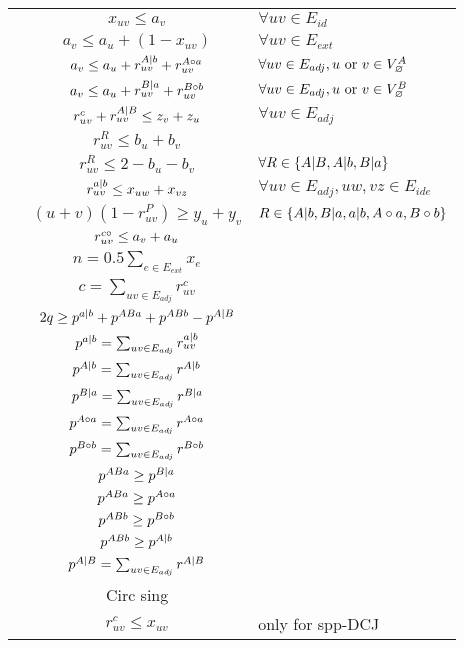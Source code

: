 \documentclass{article}[7pt]
\begin{document}
\begin{algorithm}[htb]
\begin{constraints}
\begin{tabular}{lcl}
    \cns & $x_{uv} \leq a_v$&$\forall uv\in E_{id}$\\
    \cns & $a_v \leq a_u + (1-x_{uv})$&$\forall uv\in E_{ext}$\\
    \cns & $a_v \leq a_u + r_{uv}^{A| b} + r_{uv}^{A\circ a}$&$\forall uv\in E_{adj}, u \text{ or } v\in V_{\varnothing}^A$\\
    & $a_v \leq a_u + r_{uv}^{B| a} + r_{uv}^{B\circ b}$&$\forall uv\in E_{adj}, u \text{ or } v\in V_{\varnothing}^B$\\
    \cns & $r_{uv}^c + r_{uv}^{A| B} \leq z_v + z_u$&$\forall uv \in E_{adj}$\\
    \cns & $r_{uv}^{R} \leq b_u + b_v$\\
    \cns & $r_{uv}^{R} \leq 2-b_u - b_v$&$\forall R \in \{A| B, A| b, B| a\}$\\
    \cns & $r_{uv}^{a| b} \leq x_{uw} + x_{vz}$&$\forall uv\in E_{adj}, uw,vz \in E_{ide}$\\
    \cns & $(u+v)(1-r_{uv}^{P}) \geq y_u +y_v$&$R\in  \{A| b , B| a , a| b, A\circ a , B\circ b\}$\\
    \cns & $ r_{uv}^{c\circ}\leq a_v + a_u $\\

    \cns & $n = 0.5 \sum_{e \in E_{ext}} x_{e}$\\
    \cns & $c = \sum_{uv\in E_{adj}} r^c_{uv}$\\
    \cns & $2q \geq p^{a| b}+ p^{ABa} + p^{ABb} - p^{A| B} $\\
    \cns & $p^{a| b} = \sum_{uv \in E_{adj}}r^{a| b}_{uv}$\\
    \cns & $p^{A| b} = \sum_{uv \in E_{adj}} r^{A| b}$\\
    \cns & $p^{B| a} = \sum_{uv \in E_{adj}} r^{B| a}$\\
    \cns & $p^{A\circ a} = \sum_{uv \in E_{adj}} r^{A\circ a}$\\
    \cns & $p^{B\circ b} = \sum_{uv \in E_{adj}} r^{B\circ b}$\\
    \cns & $p^{ABa} \geq p^{B| a}$\\
    \cns & $p^{ABa} \geq p^{A\circ a}$\\
    \cns & $p^{ABb} \geq p^{B\circ b}$\\
    \cns & $p^{ABb} \geq p^{A| b}$\\
    \cns & $p^{A| B} = \sum_{uv\in E_{adj}} r^{A| B}$\\
    \cns\cns & Circ sing\\
    \cns & $r^{c}_{uv} \leq x_{uv}$& only for spp-DCJ\\
\end{tabular}
\end{constraints}

\end{algorithm}
\end{document}

